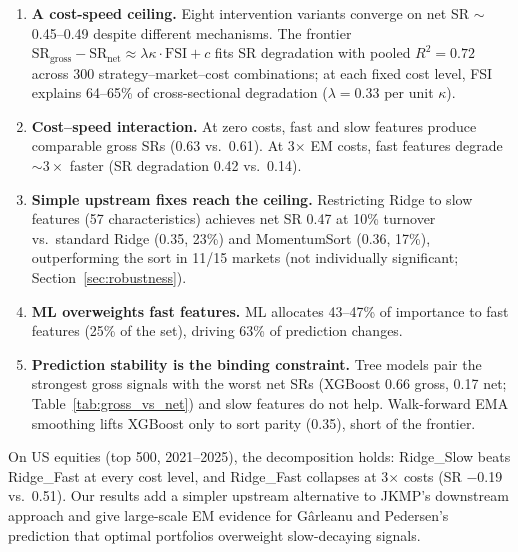 \documentclass[sigconf,balance=false]{acmart}
\begin{document}
\begin{enumerate}
    \item \textbf{A cost-speed ceiling.} Eight intervention variants
    converge on net SR ${\sim}$0.45--0.49 despite different mechanisms.
    The frontier $\text{SR}_{\text{gross}} - \text{SR}_{\text{net}}
    \approx \lambda\kappa \cdot \text{FSI} + c$ fits SR degradation
    with pooled $R^2 = 0.72$ across 300 strategy--market--cost
    combinations; at each fixed cost level, FSI explains 64--65\% of
    cross-sectional degradation ($\lambda = 0.33$ per unit $\kappa$).

    \item \textbf{Cost--speed interaction.} At zero costs, fast and slow
    features produce comparable gross SRs (0.63 vs.\ 0.61). At
    3$\times$ EM costs, fast features degrade ${\sim}3\times$ faster
    (SR degradation 0.42 vs.\ 0.14).

    \item \textbf{Simple upstream fixes reach the ceiling.} Restricting
    Ridge to slow features (57 characteristics) achieves net SR 0.47
    at 10\% turnover vs.\ standard Ridge (0.35, 23\%) and MomentumSort
    (0.36, 17\%), outperforming the sort in 11/15 markets (not
    individually significant; Section~\ref{sec:robustness}).

    \item \textbf{ML overweights fast features.} ML allocates
    43--47\% of importance to fast features (25\% of the set),
    driving 63\% of prediction changes.

    \item \textbf{Prediction stability is the binding constraint.}
    Tree models pair the strongest gross signals with the worst net
    SRs (XGBoost 0.66 gross, 0.17 net; Table~\ref{tab:gross_vs_net})
    and slow features do not help. Walk-forward EMA smoothing lifts
    XGBoost only to sort parity (0.35), short of the frontier.
\end{enumerate}

On US equities (top 500, 2021--2025), the decomposition holds:
Ridge\_Slow beats Ridge\_Fast at every cost level, and Ridge\_Fast
collapses at 3$\times$ costs (SR $-$0.19 vs.\ 0.51). Our results add a
simpler upstream alternative to JKMP's downstream approach and give
large-scale EM evidence for G\^{a}rleanu and
Pedersen's~\cite{garleanu2013dynamic} prediction that optimal
portfolios overweight slow-decaying signals.


\end{document}
